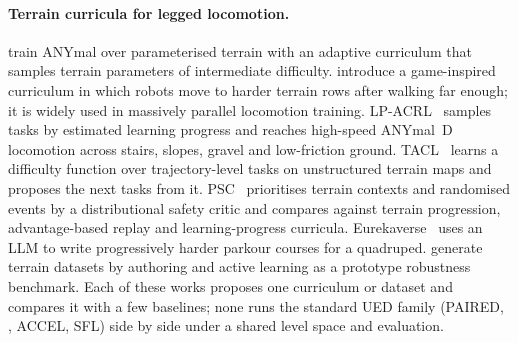 \paragraph{Terrain curricula for legged locomotion.}
\citet{lee2020learning} train ANYmal over parameterised terrain with an
adaptive curriculum that samples terrain parameters of intermediate
difficulty. \citet{rudin2022learning} introduce a game-inspired curriculum
in which robots move to harder terrain rows after walking far enough; it is
widely used in massively parallel locomotion training.
LP-ACRL~\citep{li2026lpacrl} samples tasks by estimated learning progress
and reaches high-speed ANYmal~D locomotion across stairs, slopes, gravel and
low-friction ground.
TACL~\citep{liu2026tacl} learns a difficulty function over
trajectory-level tasks on unstructured terrain maps and proposes the next
tasks from it.
PSC~\citep{ovinnikov2026psc} prioritises terrain contexts and randomised
events by a distributional safety critic and compares against terrain
progression, advantage-based replay and learning-progress curricula.
Eurekaverse~\citep{liang2024eurekaverse} uses an LLM to write progressively
harder parkour courses for a quadruped.
\citet{zhang2022terrain} generate terrain datasets by authoring and active
learning as a prototype robustness benchmark.
Each of these works proposes one curriculum or dataset and compares it
with a few baselines; none runs the standard UED family (PAIRED, \plr,
ACCEL, SFL) side by side under a shared level space and evaluation.
